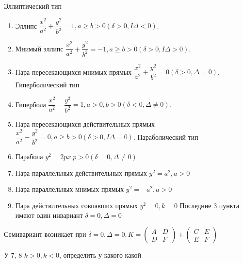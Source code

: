Эллиптический тип
\begin{enumerate}
	\item Эллипс \(\dfrac{x^2}{a^2}+\dfrac{y^2}{b^2} = 1, a\ge b>0(\delta>0, I\Delta<0)\).
	\item Мнимый эллипс \(\dfrac{x^2}{a^2}+\dfrac{y^2}{b^2} = -1, a\ge b>0(\delta>0, I\Delta>0)\).
	\item Пара пересекающихся мнимых прямых \(\dfrac{x^2}{a^2}+\dfrac{y^2}{b^2} = 0(\delta>0, \Delta=0)\). \newline
	Гиперболический тип
	\item Гипербола \(\dfrac{x^2}{a^2}-\dfrac{y^2}{b^2} = 1, a>0, b>0(\delta<0, \Delta\ne0)\).
	\item Пара пересекающихся действительных прямых \(\dfrac{x^2}{a^2}-\dfrac{y^2}{b^2} = 0, a\ge b>0(\delta>0, I\Delta=0)\).
	Параболический тип
	\item Парабола \(y^2 = 2px. p>0 (\delta=0,\Delta\ne0)\)
	\item Пара параллельных действительных прямых \(y^2 = a^2, a > 0\)
	\item Пара параллельных мнимых прямых \(y^2 = -a^2, a>0\)
	\item Пара действительных совпавших прямых \(y^2=0, k = 0\)\newline
	Последние 3 пункта имеют один инвариант \(\delta = 0, \Delta = 0\)
\end{enumerate}
Семивариант возникает при \(\delta=0, \Delta = 0, K = \begin{pmatrix}
	A & D \\ D & F
\end{pmatrix} + \begin{pmatrix}
C & E \\ E & F
\end{pmatrix}\)
\begin{exercise}
	У 7, 8 \(k>0, k < 0\), определить у какого какой
\end{exercise}
